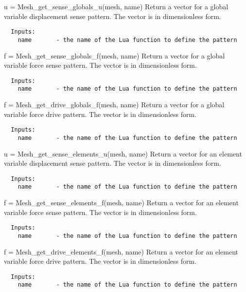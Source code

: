 \begin{codelist}
  \item[u = Mesh\_get\_sense\_globals\_u(mesh, name)]
  Return a vector for a global variable displacement sense pattern.
  The vector is in dimensionless form.
\begin{verbatim}
  Inputs:
    name       - the name of the Lua function to define the pattern
\end{verbatim}

  \item[f = Mesh\_get\_sense\_globals\_f(mesh, name)]
  Return a vector for a global variable force sense pattern.
  The vector is in dimensionless form.
\begin{verbatim}
  Inputs:
    name       - the name of the Lua function to define the pattern
\end{verbatim}

  \item[f = Mesh\_get\_drive\_globals\_f(mesh, name)]
  Return a vector for a global variable force drive pattern.
  The vector is in dimensionless form.
\begin{verbatim}
  Inputs:
    name       - the name of the Lua function to define the pattern
\end{verbatim}

  \item[u = Mesh\_get\_sense\_elements\_u(mesh, name)]
  Return a vector for an element variable displacement sense pattern.
  The vector is in dimensionless form.
\begin{verbatim}
  Inputs:
    name       - the name of the Lua function to define the pattern
\end{verbatim}

  \item[f = Mesh\_get\_sense\_elements\_f(mesh, name)]
  Return a vector for an element variable force sense pattern.
  The vector is in dimensionless form.
\begin{verbatim}
  Inputs:
    name       - the name of the Lua function to define the pattern
\end{verbatim}

  \item[f = Mesh\_get\_drive\_elements\_f(mesh, name)]
  Return a vector for an element variable force drive pattern.
  The vector is in dimensionless form.
\begin{verbatim}
  Inputs:
    name       - the name of the Lua function to define the pattern
\end{verbatim}

\end{codelist}

